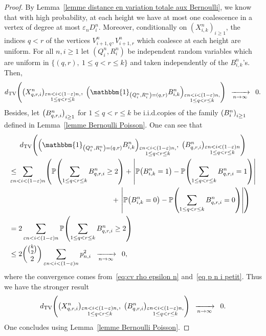 \documentclass[10pt]{amsart}
\theoremstyle{definition}\newtheorem{defi}[theo]{Definition}\newtheorem{rema}[theo]{Remark}\newtheorem{exam}[theo]{Example}\newtheorem{exem}[theo]{Example}\newtheorem{nota}[theo]{Notation}
\newcommand{\e}{\varepsilon}
\newcommand{\cv}[1][n]{\enskip\xrightarrow[#1 \to \infty]{}\enskip}
\DeclareMathOperator{\TV}{TV}
\renewcommand{\P}{{\mathbb{P}}}
\newcommand{\1}{\mathbbm{1}}
\let\originalleft\left
\let\originalright\right
\renewcommand{\left}{\mathopen{}\mathclose\bgroup\originalleft}
\renewcommand{\right}{\aftergroup\egroup\originalright}
\renewcommand*{\to}{\mathchoice{\longrightarrow}{\rightarrow}{\rightarrow}{\rightarrow}}
\begin{document}
\begin{proof}
By Lemma~\ref{lemme distance en variation totale aux Bernoulli}, we know that with high probability, at each height we have at most one coalescence in a vertex of degree at most $\e_n D^n_i$. Moreover, conditionally on $(X^n_{i,k})_{i \ge 1}$, the indices $q<r$ of the vertices $V^n_{i+1,q}, V^n_{i+1,r}$ which coalesce at each height are uniform. For all $n,i\ge 1$ let $(Q^n_i,R^n_i)$ be independent random\pagebreak{} variables which are uniform in $\{(q,r), \ 1 \le q<r \le k\}$ and taken independently of the $B^n_{i,{k}}$'s. Then,
\[
d_{\TV}\left(
\left(X^n_{q,r,i}\right)_{\substack{\e n <i < (1-\e) n,\\ 1 \le q < r \le k}},\;
\left(\1_{\left(Q^n_i,R^n_i\right)=(q,r)}B^n_{i,{k}}\right)_{\substack{\e n <i < (1-\e) n,\\ 1 \le q < r \le k}}
\right)
\cv[n] 0.
\]
Besides, {let $\left(B^n_{q,r,i}\right)_{i\ge 1}$ for $1 \le q<r \le k$ be i.i.d.\@ copies of the family $\left(B^n_{i}\right)_{i\ge 1}$ defined in Lemma~\ref{lemme Bernoulli Poisson}}. One can see that
\begin{multline*}
d_{\TV} \left(
\left(\1_{\left(Q^n_i,R^n_i\right)=(q,r)}B^n_{i,{k}}\right)_{\substack{\e n <i < (1-\e) n,\\ 1 \le q < r \le k}},\;
\left(B^n_{q,r,i}\right)_{\substack{\e n <i < (1-\e) n\\ 1 \le q < r \le k}}
\right)\\
\begin{aligned}
&\le \!\!\!\!\!\!\!\sum_{\e n <i < (1-\e)n} \left(\P\left(\sum_{1 \le q<r\le k} B^n_{q,r,i} \ge 2\right) + \left| \P\left(B^n_{i,{k}} = 1\right) - \P\left(\sum_{1 \le q<r\le k} B^n_{q,r,i} = 1\right)\right| \right.\\
&\mkern258mu+ \left.\left| \P\left(B^n_{i,{k}} = 0\right) - \P\left(\sum_{1 \le q<r\le k} B^n_{q,r,i} = 0\right)\right|\right)\\
&= 2 \sum_{\e n < i <(1-\e) n}\P\left(\sum_{1 \le q<r\le k} B^n_{q,r,i} \ge 2\right)\\
&\le 2\binom{\binom{k}{2}}{2} \sum_{\e n < i <(1-\e)n} p_{n,i}^2\cv[n] 0,
\end{aligned}
\end{multline*}
where the convergence comes from~\eqref{eq:cv rho epsilon n} and~\eqref{eq p n i petit}. Thus we have the stronger result
\[
d_{\TV}\left(
\left(X^n_{q,r,i}\right)_{\substack{\e n <i < (1-\e) n,\\ 1 \le q < r \le k}},\;
\left(B^n_{q,r,i}\right)_{\substack{\e n <i < (1-\e) n,\\ 1 \le q < r \le k}}
\right)
\cv[n] 0.
\]
One concludes using Lemma~\ref{lemme Bernoulli Poisson}.
\end{proof}
\end{document}
